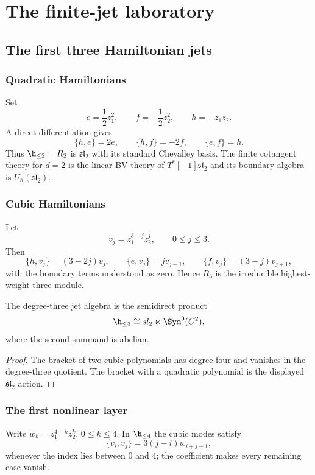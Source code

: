 \part{The finite-jet laboratory}

\chapter{The first three Hamiltonian jets}
\section{Quadratic Hamiltonians}
Set
\[
 e=\frac12z_1^2,
 \qquad
 f=-\frac12z_2^2,
 \qquad
 h=-z_1z_2.
\]
A direct differentiation gives
\[
 \{h,e\}=2e,
 \qquad
 \{h,f\}=-2f,
 \qquad
 \{e,f\}=h.
\]
Thus $\h_{\le2}=R_2$ is $\mathfrak{sl}_2$ with its standard Chevalley basis.  The finite cotangent theory for $d=2$ is the linear BV theory of $T^*[-1]\mathfrak{sl}_2$ and its boundary algebra is $U_\hbar(\mathfrak{sl}_2)$.

\section{Cubic Hamiltonians}
Let
\[
 v_j=z_1^{3-j}z_2^j,
 \qquad 0\le j\le3.
\]
Then
\[
 \{h,v_j\}=(3-2j)v_j,
 \qquad
 \{e,v_j\}=jv_{j-1},
 \qquad
 \{f,v_j\}=(3-j)v_{j+1},
\]
with the boundary terms understood as zero.  Hence $R_3$ is the irreducible highest-weight-three module.

\begin{proposition}
The degree-three jet algebra is the semidirect product
\[
 \h_{\le3}\cong\mathfrak{sl}_2\ltimes\Sym^3(\C^2),
\]
where the second summand is abelian.
\end{proposition}
\begin{proof}
The bracket of two cubic polynomials has degree four and vanishes in the degree-three quotient.  The bracket with a quadratic polynomial is the displayed $\mathfrak{sl}_2$ action.
\end{proof}

\section{The first nonlinear layer}
Write $w_k=z_1^{4-k}z_2^k$, $0\le k\le4$.  In $\h_{\le4}$ the cubic modes satisfy
\begin{equation}\label{eq:vol2-cubic-quartic}
 \{v_i,v_j\}=3(j-i)w_{i+j-1},
\end{equation}
whenever the index lies between $0$ and $4$; the coefficient makes every remaining case vanish.

